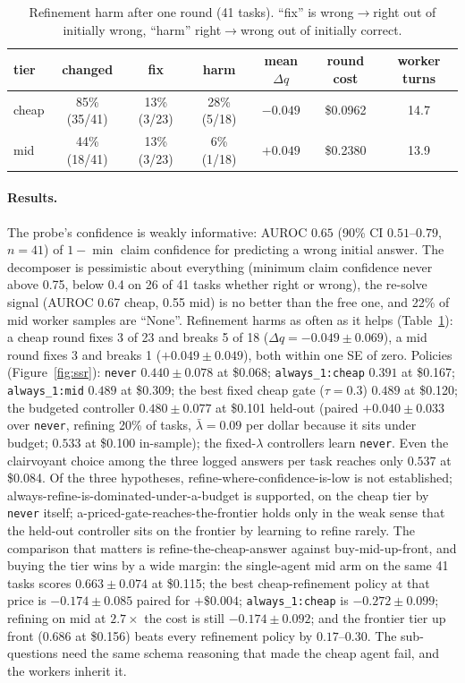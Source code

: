 \documentclass[10pt]{article}
\newcommand{\code}[1]{\texttt{#1}}
\begin{document}
\begin{table}[htbp]
\centering\small
\caption{Refinement harm after one round (41 tasks). ``fix'' is wrong$\to$right out of initially wrong, ``harm'' right$\to$wrong out of initially correct.}
\label{tab:ssrharm}
\begin{tabular}{lcccccc}
\toprule
tier & changed & fix & harm & mean $\Delta q$ & round cost & worker turns \\
\midrule
cheap & 85\% (35/41) & 13\% (3/23) & 28\% (5/18) & $-0.049$ & \$0.0962 & 14.7 \\
mid & 44\% (18/41) & 13\% (3/23) & 6\% (1/18) & $+0.049$ & \$0.2380 & 13.9 \\
\bottomrule
\end{tabular}
\end{table}

\paragraph{Results.} The probe's confidence is weakly informative: AUROC $0.65$ (90\% CI $0.51$--$0.79$, $n=41$) of $1-\min$ claim confidence for predicting a wrong initial answer. The decomposer is pessimistic about everything (minimum claim confidence never above 0.75, below 0.4 on 26 of 41 tasks whether right or wrong), the re-solve signal (AUROC 0.67 cheap, 0.55 mid) is no better than the free one, and 22\% of mid worker samples are ``None''. Refinement harms as often as it helps (Table~\ref{tab:ssrharm}): a cheap round fixes 3 of 23 and breaks 5 of 18 ($\Delta q=-0.049\pm0.069$), a mid round fixes 3 and breaks 1 ($+0.049\pm0.049$), both within one SE of zero. Policies (Figure~\ref{fig:ssr}): \code{never} $0.440\pm0.078$ at \$0.068; \code{always\_1:cheap} $0.391$ at \$0.167; \code{always\_1:mid} $0.489$ at \$0.309; the best fixed cheap gate ($\tau=0.3$) $0.489$ at \$0.120; the budgeted controller $0.480\pm0.077$ at \$0.101 held-out (paired $+0.040\pm0.033$ over \code{never}, refining 20\% of tasks, $\bar\lambda=0.09$ per dollar because it sits under budget; $0.533$ at \$0.100 in-sample); the fixed-$\lambda$ controllers learn \code{never}. Even the clairvoyant choice among the three logged answers per task reaches only $0.537$ at \$0.084. Of the three hypotheses, refine-where-confidence-is-low is not established; always-refine-is-dominated-under-a-budget is supported, on the cheap tier by \code{never} itself; a-priced-gate-reaches-the-frontier holds only in the weak sense that the held-out controller sits on the frontier by learning to refine rarely. The comparison that matters is refine-the-cheap-answer against buy-mid-up-front, and buying the tier wins by a wide margin: the single-agent mid arm on the same 41 tasks scores $0.663\pm0.074$ at \$0.115; the best cheap-refinement policy at that price is $-0.174\pm0.085$ paired for $+\$0.004$; \code{always\_1:cheap} is $-0.272\pm0.099$; refining on mid at $2.7\times$ the cost is still $-0.174\pm0.092$; and the frontier tier up front ($0.686$ at \$0.156) beats every refinement policy by $0.17$--$0.30$. The sub-questions need the same schema reasoning that made the cheap agent fail, and the workers inherit it.
\end{document}
